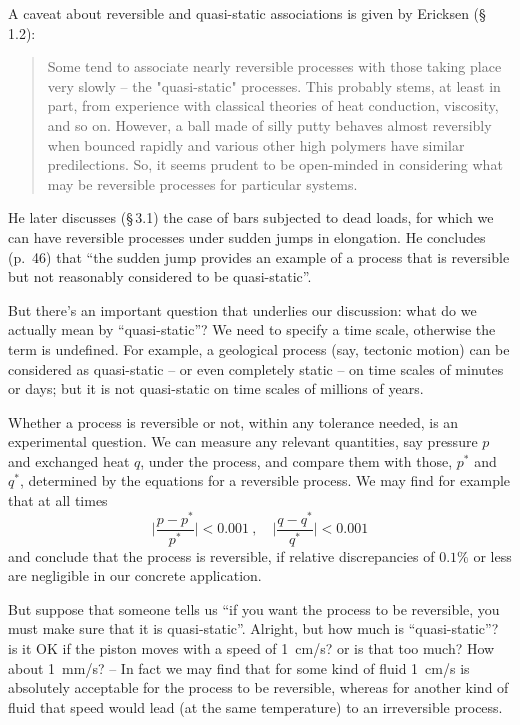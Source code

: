\documentclass[a4paper,12pt,%
onecolumn,oneside,titlepage,%
british%
]{memoir}
\renewcommand*{\|}[1][]{\nonscript\:#1\vert\nonscript\:\mathopen{}}
\newcommand*{\sect}{\S}%
\begin{document}
A caveat about reversible and quasi-static associations is given by Ericksen (\sect\,1.2):
\begin{quote}
  Some tend to associate nearly reversible processes with those taking place very slowly -- the "quasi-static" processes. This probably stems, at least in part, from experience with classical theories of heat conduction, viscosity, and so on. However, a ball made of silly putty behaves almost reversibly when bounced rapidly and various other high polymers have similar predilections. So, it seems prudent to be open-minded in considering what may be reversible processes for particular systems.
\end{quote}
He later discusses (\sect\,3.1) the case of bars subjected to dead loads, for which we can have reversible processes under sudden jumps in elongation. He concludes (p.~46) that \enquote{the sudden jump provides an example of a process that is reversible but not reasonably considered to be quasi-static}.

\medskip

But there's an important question that underlies our discussion: what do we actually mean by \enquote{quasi-static}? We need to specify a time scale, otherwise the term is undefined. For example, a geological process (say, tectonic motion) can be considered as quasi-static -- or even completely static -- on time scales of minutes or days; but it is not quasi-static on time scales of millions of years.

Whether a process is reversible or not, within any tolerance needed, is an experimental question. We can measure any relevant quantities, say pressure $p$ and exchanged heat $q$, under the process, and compare them with those, $p^*$ and $q^*$, determined by the equations for a reversible process. We may find for example that at all times
$$\biggl\lvert\frac{p - p^*}{p^*}\biggr\rvert < 0.001 \ ,
\quad
\biggl\lvert\frac{q - q^*}{q^*}\biggr\rvert < 0.001
$$
and conclude that the process is reversible, if relative discrepancies of $0.1\%$ or less are negligible in our concrete application.

But suppose that someone tells us \enquote{if you want the process to be reversible, you must make sure that it is quasi-static}. Alright, but how much is \enquote{quasi-static}? is it OK if the piston moves with a speed of 1~cm/s? or is that too much? How about 1~mm/s? -- In fact we may find that for some kind of fluid 1~cm/s is absolutely acceptable for the process to be reversible, whereas for another kind of fluid that speed would lead (at the same temperature) to an irreversible process.
\end{document}
